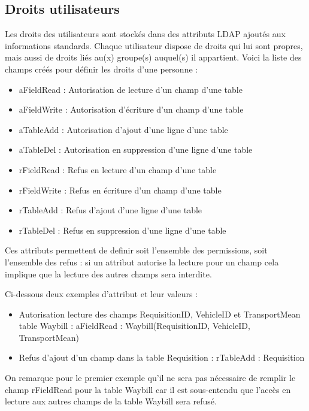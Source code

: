\subsection{Droits utilisateurs}
Les droits des utilisateurs sont stockés dans des attributs LDAP ajoutés aux informations standards. Chaque utilisateur dispose de droits qui lui sont propres, mais aussi de droits liés au(x) groupe(s) auquel(s) il appartient.
Voici la liste des champs créés pour définir les droits d’une personne :
\begin{itemize}
\item aFieldRead : Autorisation de lecture d’un champ d’une table
\item aFieldWrite : Autorisation d’écriture d’un champ d’une table
\item aTableAdd : Autorisation d’ajout d’une ligne d’une table
\item aTableDel : Autorisation en suppression d’une ligne d’une table
\item rFieldRead : Refus en lecture d’un champ d’une table
\item rFieldWrite : Refus en écriture d’un champ d’une table
\item rTableAdd : Refus d’ajout d’une ligne d’une table
\item rTableDel : Refus en suppression d’une ligne d’une table
\end{itemize}

Ces attributs permettent de definir soit l'ensemble des permissions, soit l'ensemble des refus  : si un attribut autorise la lecture pour un champ cela implique que la lecture des autres champs sera interdite.

Ci-dessous deux exemples d’attribut et leur valeurs :
\begin{itemize}
\item Autorisation lecture des champs RequisitionID, VehicleID et TransportMean table Waybill : 
aFieldRead : Waybill(RequisitionID, VehicleID, TransportMean)
\item Refus d’ajout d’un champ dans la table Requisition : 
rTableAdd : Requisition
\end{itemize}

On remarque pour le premier exemple qu’il ne sera pas nécessaire de remplir le champ rFieldRead pour la table Waybill car il est sous-entendu que l’accès en lecture aux autres champs de la table Waybill sera refusé. 
\newpage
